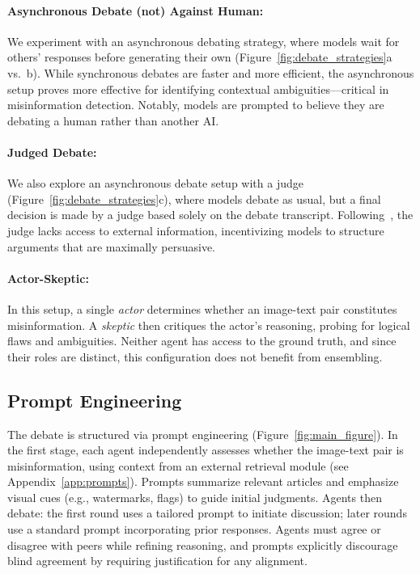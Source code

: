 \documentclass{article}
\theoremstyle{plain}
\theoremstyle{definition}
\theoremstyle{remark}
\begin{document}
\paragraph{Asynchronous Debate (not) Against Human:} We experiment with an asynchronous debating strategy, where models wait for others' responses before generating their own (Figure~\ref{fig:debate_strategies}a vs.~b). While synchronous debates are faster and more efficient, the asynchronous setup proves more effective for identifying contextual ambiguities—critical in misinformation detection. Notably, models are prompted to believe they are debating a human rather than another AI.

\paragraph{Judged Debate:}We also explore an asynchronous debate setup with a judge (Figure~\ref{fig:debate_strategies}c), where models debate as usual, but a final decision is made by a judge based solely on the debate transcript. Following~\citet{khan2024debatingpersuasivellmsleads}, the judge lacks access to external information, incentivizing models to structure arguments that are maximally persuasive.


\paragraph{Actor-Skeptic:}In this setup, a single \textit{actor} determines whether an image-text pair constitutes misinformation. A \textit{skeptic} then critiques the actor’s reasoning, probing for logical flaws and ambiguities. Neither agent has access to the ground truth, and since their roles are distinct, this configuration does not benefit from ensembling.


\subsection{Prompt Engineering}\label{sec:prompt_engg}

The debate is structured via prompt engineering (Figure~\ref{fig:main_figure}). In the first stage, each agent independently assesses whether the image-text pair is misinformation, using context from an external retrieval module (see Appendix~\ref{app:prompts}). Prompts summarize relevant articles and emphasize visual cues (e.g., watermarks, flags) to guide initial judgments. Agents then debate: the first round uses a tailored prompt to initiate discussion; later rounds use a standard prompt incorporating prior responses. Agents must agree or disagree with peers while refining reasoning, and prompts explicitly discourage blind agreement by requiring justification for any alignment.
\end{document}
